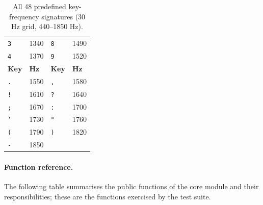 \documentclass[11pt,a4paper]{article}
\newcommand{\Key}[1]{\texttt{#1}}
\begin{document}
\begin{table}[H]
\begin{tabular}{@{}llll@{}}
        \Key{3} & 1340 & \Key{8} & 1490 \\
        \Key{4} & 1370 & \Key{9} & 1520 \\
        \midrule
        \textbf{Key} & \textbf{Hz} & \textbf{Key} & \textbf{Hz} \\
        \midrule
        \Key{.} & 1550 & \Key{,} & 1580 \\
        \Key{!} & 1610 & \Key{?} & 1640 \\
        \Key{;} & 1670 & \Key{:} & 1700 \\
        \Key{'} & 1730 & \Key{"} & 1760 \\
        \Key{(} & 1790 & \Key{)} & 1820 \\
        \Key{-} & 1850 & & \\
        \bottomrule
    \end{tabular}
    \caption{All 48 predefined key-frequency signatures (30 Hz grid,
             440--1850 Hz).}
    \label{tab:frequencydb}
\end{table}

\paragraph{Function reference.}
The following table summarises the public functions of the core module and
their responsibilities; these are the functions exercised by the test suite.
\end{document}
